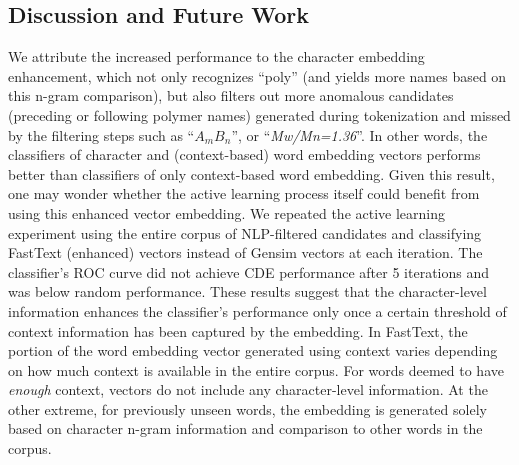 \subsection{Discussion and Future Work}
\label{sec:discussion}
We attribute the increased performance to the character embedding enhancement, which not only recognizes ``poly'' (and yields more names based on this n-gram comparison), but also filters out more anomalous candidates (preceding or following polymer names) generated during tokenization and missed by the filtering steps such as ``\textit{$A_mB_n$}'', or ``\textit{Mw/Mn=1.36}''.  
In other words, the classifiers of character and (context-based) word embedding vectors performs better than classifiers of only context-based word embedding.
Given this result, one may wonder whether the active learning process itself could benefit from using this enhanced vector embedding. 
We repeated the active learning experiment using the entire corpus of NLP-filtered candidates and classifying FastText (enhanced) vectors instead of Gensim vectors at each iteration. 
The classifier's ROC curve did not achieve CDE performance after 5 iterations and was below random performance.%
These results suggest that the character-level information enhances the classifier's performance only once a certain threshold of context information has been captured by the embedding.
In FastText, the portion of the word embedding vector generated using context varies depending on how much context is available in the entire corpus. 
For words deemed to have \textit{enough} context, vectors do not include any character-level information. 
At the other extreme, for previously unseen words, the embedding is generated solely based on character n-gram information and comparison to other words in the corpus.

